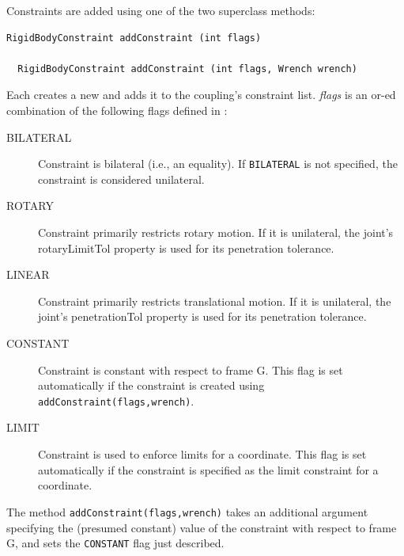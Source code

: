 Constraints are added using one of the two superclass methods:
\begin{lstlisting}[]
  RigidBodyConstraint addConstraint (int flags)

  RigidBodyConstraint addConstraint (int flags, Wrench wrench)
\end{lstlisting}
%
Each creates a new
and adds it to the coupling's constraint list.
{\it flags} is an or-ed combination of the following flags 
defined in
:
\begin{description}

\item[BILATERAL]\mbox{}

Constraint is bilateral (i.e., an equality). If {\tt BILATERAL}
is not specified, the constraint is considered unilateral.

\item[ROTARY]\mbox{}

Constraint primarily restricts rotary motion. If it is unilateral, the
joint's {\sf rotaryLimitTol} property is used for its penetration tolerance.

\item[LINEAR]\mbox{}

Constraint primarily restricts translational motion. If it is
unilateral, the joint's {\sf penetrationTol} property is used for its
penetration tolerance.

\item[CONSTANT]\mbox{}

Constraint is constant with respect to frame G. This flag is set
automatically if the constraint is created using {\tt
addConstraint(flags,wrench)}.

\item[LIMIT]\mbox{}

Constraint is used to enforce limits for a coordinate.  This flag is
set automatically if the constraint is specified as the limit
constraint for a coordinate.

\end{description}
%
The method {\tt addConstraint(flags,wrench)} takes an additional
 argument specifying the
(presumed constant) value of the constraint with respect to frame G,
and sets the {\tt CONSTANT} flag just described.  


